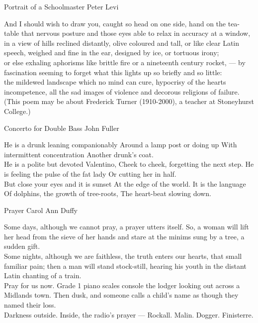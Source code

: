 \begin{poem}
{Portrait of a Schoolmaster}
{Peter Levi}

And I should wish to draw you, caught so
head on one side, hand on the tea-table
that nervous posture and those eyes able
to relax in accuracy at a window,\\

in a view of hills reclined distantly,
olive coloured and tall, or like clear
Latin speech, weighed and fine in the ear,
designed by ice, or tortuous irony;\\

or else exhaling aphorisms like brittle
fire or a nineteenth century rocket,
--- by fascination seeming to forget
what this lights up so briefly and so little:\\

the mildewed landscape which no mind can cure,
hypocrisy of the hearts incompetence,
all the sad images of violence
and decorous religions of failure.\\

(This poem may be about Frederick Turner (1910-2000), a teacher at Stoneyhurst College.)
\end{poem}


\begin{poem}
{Concerto for Double Bass}
{John Fuller}

 He is a drunk leaning companionably
 Around a lamp post or doing up
 With intermittent concentration
 Another drunk's coat.\\

 He is a polite but devoted Valentino,
 Cheek to cheek, forgetting the next step.
 He is feeling the pulse of the fat lady
 Or cutting her in half.\\
 
 But close your eyes and it is sunset
 At the edge of the world. It is the language
 Of dolphins, the growth of tree-roots,
 The heart-beat slowing down.\\

\end{poem}

\begin{poem}
{Prayer}
{Carol Ann Duffy}
 
 Some days, although we cannot pray, a prayer
 utters itself. So, a woman will lift
 her head from the sieve of her hands and stare
 at the minims sung by a tree, a sudden gift.\\
 
 Some nights, although we are faithless, the truth
 enters our hearts, that small familiar pain;
 then a man will stand stock-still, hearing his youth
 in the distant Latin chanting of a train.\\
 
 Pray for us now. Grade 1 piano scales
 console the lodger looking out across
 a Midlands town. Then dusk, and someone calls
 a child's name as though they named their loss.\\
 
 Darkness outside. Inside, the radio's prayer ---
 Rockall. Malin. Dogger. Finisterre.\\
\end{poem}
 

